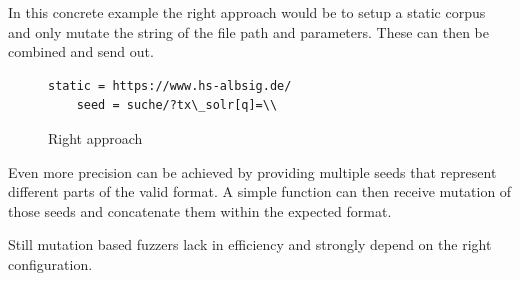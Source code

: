 \documentclass[journal=tosc,final]{iacrtrans}
\begin{document}
In this concrete example the right approach would be to setup a  static corpus and only mutate the string of the file path and parameters. 
These can then be combined and send out.


\begin{figure}[h]
 \caption{Right approach}
 \begin{lstlisting}[style=code]
	static = https://www.hs-albsig.de/  
	seed = suche/?tx\_solr[q]=\\
 \end{lstlisting}
\end{figure}


Even more precision can be achieved by providing multiple seeds that represent different parts of the valid format. A simple function can then receive mutation of those seeds and concatenate them within the expected format.

Still mutation based fuzzers lack in efficiency and strongly depend on the right configuration. 
\newpage
\end{document}
